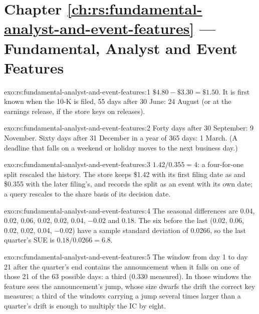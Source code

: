 \section*{Chapter \ref{ch:rs:fundamental-analyst-and-event-features} --- Fundamental, Analyst and Event Features}

\begin{solution}{exo:rs:fundamental-analyst-and-event-features:1}
$\$4.80 - \$3.30 = \$1.50$. It is first known when the 10-K is filed, 55 days after 30 June: 24 August (or at the earnings release, if
the store keys on releases).
\end{solution}

\begin{solution}{exo:rs:fundamental-analyst-and-event-features:2}
Forty days after 30 September: 9 November. Sixty days after 31 December in a year of 365 days: 1 March. (A deadline that falls on a weekend
or holiday moves to the next business day.)
\end{solution}

\begin{solution}{exo:rs:fundamental-analyst-and-event-features:3}
$1.42/0.355 = 4$: a four-for-one split rescaled the history. The store keeps \$1.42 with its first filing date as  and \$0.355
with the later filing's, and records the split as an event with its own date; a query rescales to the share basis of its decision date.
\end{solution}

\begin{solution}{exo:rs:fundamental-analyst-and-event-features:4}
The seasonal differences are 0.04, 0.02, 0.06, 0.02, 0.02, 0.04, $-0.02$ and 0.18. The six before the last (0.02, 0.06, 0.02, 0.02, 0.04,
$-0.02$) have a sample standard deviation of 0.0266, so the last quarter's SUE is $0.18/0.0266 = 6.8$.
\end{solution}

\begin{solution}{exo:rs:fundamental-analyst-and-event-features:5}
The window from day 1 to day 21 after the quarter's end contains the announcement when it falls on one of those 21 of the 63 possible days: a
third (0.330 measured). In those windows the feature sees the announcement's jump, whose size dwarfs the drift the correct key measures; a third
of the windows carrying a jump several times larger than a quarter's drift is enough to multiply the IC by eight.
\end{solution}

